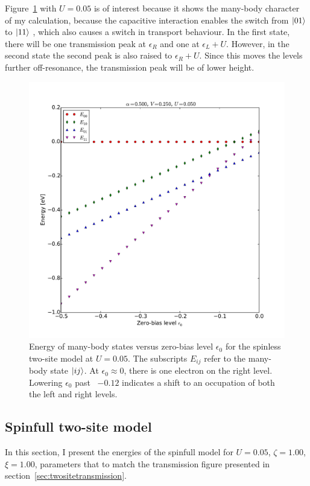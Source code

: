 Figure~\ref{fig:perrinenergy1} with $U=0.05$ is of interest because it shows the many-body character of my calculation, because the capacitive interaction enables the switch from $\ket{01}$ to $\ket{11}$ , which also causes a switch in transport behaviour. In the first state, there will be one transmission peak at $\epsilon_R$ and one at $\epsilon_L + U$. However, in the second state the second peak is also raised to $\epsilon_R+U$. Since this moves the levels further off-resonance, the transmission peak will be of lower height. 
\begin{figure}[htb]
    \centering
    \includegraphics[height=.45\textheight]{pdf/energy/perrin_distribution_u1.pdf}
    \caption{Energy of many-body states versus zero-bias level $\epsilon_0$ for the spinless two-site model at $U=0.05$. The subscripts $E_{ij}$ refer to the many-body state $\ket{i j}$. At $\epsilon_0 \approx 0$, there is one electron on the right level. Lowering $\epsilon_0$ past ~$-0.12$ indicates a shift to an occupation of both the left and right levels.  }
    \label{fig:perrinenergy1}
\end{figure} 

 
\subsection{Spinfull two-site model} 
In this section, I present the energies of the spinfull model for $U=0.05$, $\zeta=1.00$, $\xi=1.00$, parameters that to match the transmission figure presented in section~\ref{sec:twositetransmission}.
 
